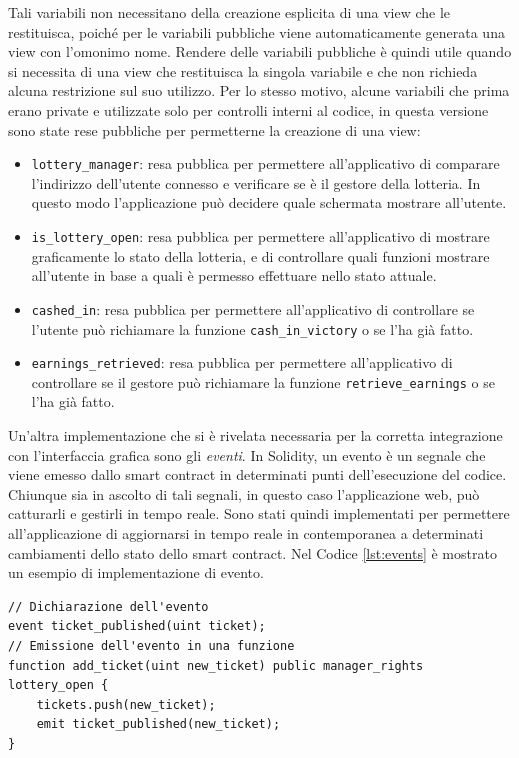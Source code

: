 \documentclass[12pt,a4paper,openright,twoside]{report}
\begin{document}
Tali variabili non necessitano della creazione esplicita di una view che le restituisca, poiché per le variabili pubbliche viene automaticamente generata una view con l'omonimo nome. Rendere delle variabili pubbliche è quindi utile quando si necessita di una view che restituisca la singola variabile e che non richieda alcuna restrizione sul suo utilizzo. Per lo stesso motivo, alcune variabili che prima erano private e utilizzate solo per controlli interni al codice, in questa versione sono state rese pubbliche per permetterne la creazione di una view:
\begin{itemize}
    \item \texttt{lottery\_manager}: resa pubblica per permettere all'applicativo di comparare l'indirizzo dell'utente connesso e verificare se è il gestore della lotteria. In questo modo l'applicazione può decidere quale schermata mostrare all'utente.
    \item \texttt{is\_lottery\_open}: resa pubblica per permettere all'applicativo di mostrare graficamente lo stato della lotteria, e di controllare quali funzioni mostrare all'utente in base a quali è permesso effettuare nello stato attuale.
    \item \texttt{cashed\_in}: resa pubblica per permettere all'applicativo di controllare se l'utente può richiamare la funzione \texttt{cash\_in\_victory} o se l'ha già fatto.
    \item \texttt{earnings\_retrieved}: resa pubblica per permettere all'applicativo di controllare se il gestore può richiamare la funzione \texttt{retrieve\_earnings} o se l'ha già fatto.
\end{itemize}
Un'altra implementazione che si è rivelata necessaria per la corretta integrazione con l'interfaccia grafica sono gli \textit{eventi}. In Solidity, un evento è un segnale che viene emesso dallo smart contract in determinati punti dell'esecuzione del codice. Chiunque sia in ascolto di tali segnali, in questo caso l'applicazione web, può catturarli e gestirli in tempo reale. Sono stati quindi implementati per permettere all'applicazione di aggiornarsi in tempo reale in contemporanea a determinati cambiamenti dello stato dello smart contract. Nel Codice \ref{lst:events} è mostrato un esempio di implementazione di evento.
\begin{lstlisting}[language=Solidity, caption=Utilizzo degli eventi, label={lst:events}]
// Dichiarazione dell'evento
event ticket_published(uint ticket);
// Emissione dell'evento in una funzione
function add_ticket(uint new_ticket) public manager_rights lottery_open {
    tickets.push(new_ticket);
    emit ticket_published(new_ticket);
}
\end{lstlisting}
\end{document}
